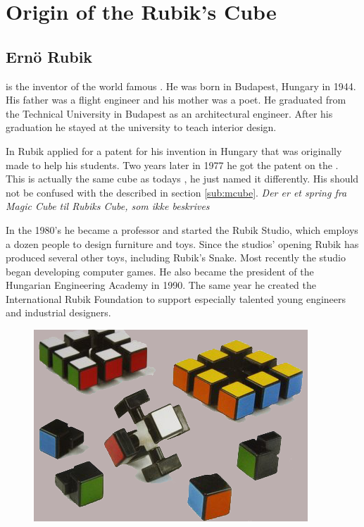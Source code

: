 \chapter{Origin of the Rubik's Cube}

\section{Ern\"{o} Rubik}
\erno{} is the inventor of the world famous \rubik{}. He was born in Budapest, Hungary in 1944. His father was a flight engineer and his mother was a poet. He graduated from the Technical University in Budapest as an architectural engineer. After his graduation he stayed at the university to teach interior design.

In  Rubik applied for a patent for his invention in Hungary that was originally made to help his students. Two years later in 1977 he got the patent on the \mcube{}. 
This \mcube{} is actually the same cube as todays \rubik{}, he just named it differently. 
His \mcube{} should not be confused with the \mcube{} described in section \ref{sub:mcube}.
\emph{ Der er et spring fra Magic Cube til Rubiks Cube, som ikke beskrives}

In the 1980's he became a professor and started the Rubik Studio, which employs a dozen people to design furniture and toys. 
Since the studios' opening Rubik has produced several other toys, including Rubik's Snake. Most recently  the studio began developing computer games. 
He also became the president of the Hungarian Engineering Academy in 1990. The same year he created the International Rubik Foundation to support especially talented young engineers and industrial designers.

\begin{figure}
	\centering
		\includegraphics[scale=0.6]{input/pics/rubiks-cube.png}
	\caption{}
	\label{fig:rubiks-cube}
\end{figure}
 
